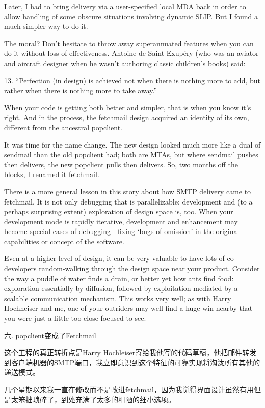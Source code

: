 \documentclass[a4paper,12pt,UTF8,twoside]{ctexbook}
\begin{document}
Later, I had to bring delivery via a user-specified local MDA back in order to allow handling of some obscure situations involving dynamic SLIP. But I found a much simpler way to do it.

The moral? Don't hesitate to throw away superannuated features when you can do it without loss of effectiveness. Antoine de Saint-Exupéry (who was an aviator and aircraft designer when he wasn't authoring classic children's books) said:

13. ``Perfection (in design) is achieved not when there is nothing more to add, but rather when there is nothing more to take away.''

When your code is getting both better and simpler, that is when you know it's right. And in the process, the fetchmail design acquired an identity of its own, different from the ancestral popclient.

It was time for the name change. The new design looked much more like a dual of sendmail than the old popclient had; both are MTAs, but where sendmail pushes then delivers, the new popclient pulls then delivers. So, two months off the blocks, I renamed it fetchmail.

There is a more general lesson in this story about how SMTP delivery came to fetchmail. It is not only debugging that is parallelizable; development and (to a perhaps surprising extent) exploration of design space is, too. When your development mode is rapidly iterative, development and enhancement may become special cases of debugging—fixing `bugs of omission' in the original capabilities or concept of the software.

Even at a higher level of design, it can be very valuable to have lots of co-developers random-walking through the design space near your product. Consider the way a puddle of water finds a drain, or better yet how ants find food: exploration essentially by diffusion, followed by exploitation mediated by a scalable communication mechanism. This works very well; as with Harry Hochheiser and me, one of your outriders may well find a huge win nearby that you were just a little too close-focused to see.

六. popclient变成了Fetchmail


这个工程的真正转折点是Harry Hochleiser寄给我他写的代码草稿，他把邮件转发到客户端机器的SMTP端口，我立即意识到这个特征的可靠实现将淘汰所有其他的递送模式。


几个星期以来我一直在修改而不是改进fetchmail，因为我觉得界面设计虽然有用但是太笨拙琐碎了，到处充满了太多的粗陋的细小选项。
\end{document}
